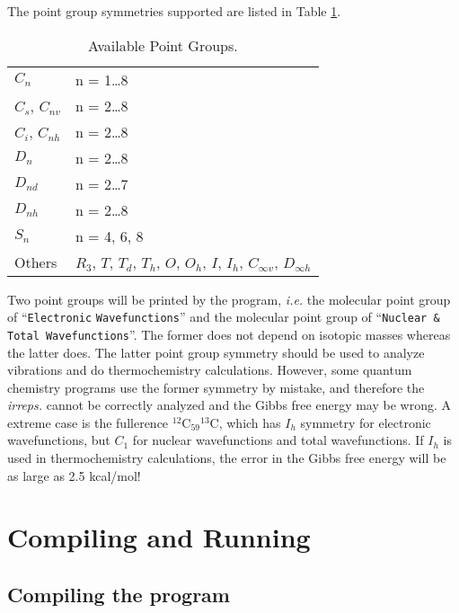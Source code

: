 \documentclass[12pt,english]{extarticle}
\begin{document}
The point group symmetries supported are listed in Table \ref{tab:symm}.

\begin{table}[H]
\caption{Available Point Groups.}\label{tab:symm}
\small\centering
\begin{tabular}{ll}
\hline\hline
$C_{n}$           & n = 1\ldots 8 \\
$C_s$, $C_{nv}$   & n = 2\ldots 8 \\
$C_i$, $C_{nh}$   & n = 2\ldots 8 \\
$D_{n}$           & n = 2\ldots 8 \\
$D_{nd}$          & n = 2\ldots 7 \\
$D_{nh}$          & n = 2\ldots 8 \\
$S_{n}$           & n = 4, 6, 8 \\
Others            & $R_3$, $T$, $T_d$, $T_h$, $O$, $O_h$, $I$, $I_h$, $C_{\infty v}$, $D_{\infty h}$ \\
\hline\hline
\end{tabular}
\end{table}

Two point groups will be printed by the program, \emph{i.e.} the molecular point group of ``\verb|Electronic| \verb|Wavefunctions|'' and the molecular point group of ``\verb|Nuclear & Total Wavefunctions|''. The former does not depend on isotopic masses whereas the latter does. The latter point group symmetry should be used to analyze vibrations and do thermochemistry calculations. However, some quantum chemistry programs use the former symmetry by mistake, and therefore the \emph{irreps.} cannot be correctly analyzed and the Gibbs free energy may be wrong. A extreme case is the fullerence $^{12}$C$_{59}{}^{13}$C, which has $I_h$ symmetry for electronic wavefunctions, but $C_1$ for nuclear wavefunctions and total wavefunctions. If $I_h$ is used in thermochemistry calculations, the error in the Gibbs free energy will be as large as 2.5 kcal/mol!

\pagebreak{}


\section{Compiling and Running} \label{part:setting}

\subsection{Compiling the program} \label{sec:install}
\end{document}
